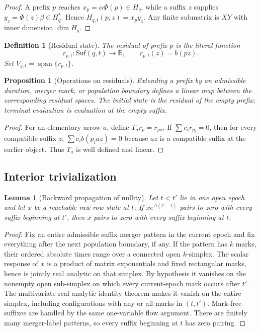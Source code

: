 \documentclass[11pt]{article}
\newtheorem{lemma}[theorem]{Lemma}
\newtheorem{proposition}[theorem]{Proposition}
\newtheorem{definition}[theorem]{Definition}
\newcommand{\R}{\mathbb R}
\begin{document}
\begin{proof}
A prefix $p$ reaches $x_p=\alpha\Phi(p)\in H_q$, while a suffix $z$ supplies $y_z=\Phi(z)\beta\in H_q^*$.  Hence $H_{q,t}(p,z)=x_py_z$.  Any finite submatrix is $XY$ with inner dimension $\dim H_q$.
\end{proof}

\begin{definition}[Residual state]
The residual of prefix $p$ is the literal function
\[
r_{p,t}:\mathrm{Suf}(q,t)\to\R,\qquad r_{p,t}(z)=b(pz).
\]
Set $V_{q,t}=\operatorname{span}\{r_{p,t}\}$.
\end{definition}

\begin{proposition}[Operations on residuals]
Extending a prefix by an admissible duration, merger mark, or population boundary defines a linear map between the corresponding residual spaces.  The initial state is the residual of the empty prefix; terminal evaluation is evaluation at the empty suffix.
\end{proposition}

\begin{proof}
For an elementary arrow $a$, define $T_a r_{p}=r_{pa}$.  If $\sum c_ir_{p_i}=0$, then for every compatible suffix $z$, $\sum c_i b(p_i a z)=0$ because $az$ is a compatible suffix at the earlier object.  Thus $T_a$ is well defined and linear.
\end{proof}

\subsection{Interior trivialization}

\begin{lemma}[Backward propagation of nullity]
\label{lem:null-backward}
Let $t<t'$ lie in one open epoch and let $x$ be a reachable raw row state at $t$.  If $xe^{A(t'-t)}$ pairs to zero with every suffix beginning at $t'$, then $x$ pairs to zero with every suffix beginning at $t$.
\end{lemma}

\begin{proof}
Fix an entire admissible suffix merger pattern in the current epoch and fix everything after the next population boundary, if any.  If the pattern has $k$ marks, their ordered absolute times range over a connected open $k$-simplex.  The scalar response of $x$ is a product of matrix exponentials and fixed rectangular marks, hence is jointly real analytic on that simplex.  By hypothesis it vanishes on the nonempty open sub-simplex on which every current-epoch mark occurs after $t'$.  The multivariate real-analytic identity theorem makes it vanish on the entire simplex, including configurations with any or all marks in $(t,t')$.  Mark-free suffixes are handled by the same one-variable flow argument.  There are finitely many merger-label patterns, so every suffix beginning at $t$ has zero pairing.
\end{proof}
\end{document}
